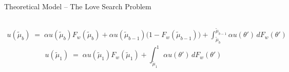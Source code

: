 \documentclass[10pt, aspectratio=169,xcolor=dvipsnames]{beamer}
\begin{document}
\begin{frame}{Theoretical Model – The Love Search Problem}
\begin{columns}
\begin{column}{0.55\textwidth}
\end{column} 
\end{columns}
\par\vspace{0.3cm}
\begin{equation}\begin{aligned} u(\widetilde \mu_b) \;=\; \alpha u(\widetilde \mu_b)F_w(\widetilde \mu_b)+\alpha u(\widetilde \mu_{b-1})\Big(1- F_w(\widetilde \mu_{b-1})\Big)+\int^{\widetilde \mu_{b-1}}_{\widetilde \mu_b} \alpha u(\theta')\,dF_w(\theta') \end{aligned}\end{equation}
\begin{equation} u(\widetilde \mu_1)\;=\;\alpha  u(\widetilde\mu_1) F_w(\widetilde\mu_1) + \int^1_{\widetilde\mu_1} \alpha u(\theta')\,dF_w(\theta') \end{equation} 
\end{frame}
\end{document}
